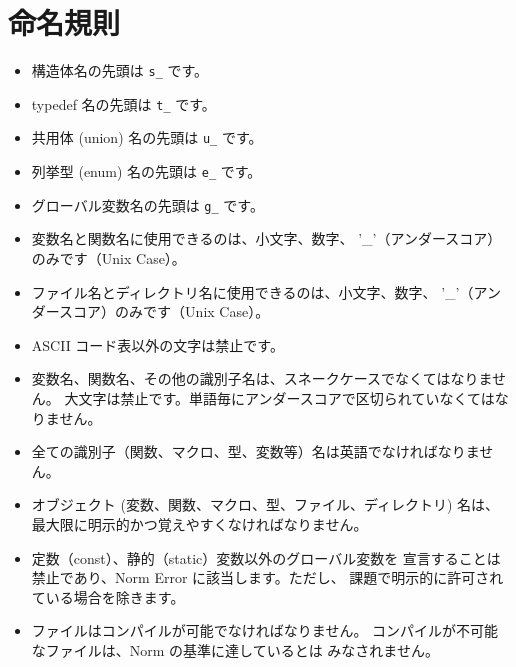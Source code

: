 \documentclass{42-ja}
\begin{document}
    \section{命名規則}

        \begin{itemize}

            \item 構造体名の先頭は
                \texttt{s\_} です。

            \item typedef 名の先頭は
                \texttt{t\_} です。

			\item 共用体 (union) 名の先頭は \texttt{u\_} です。

			\item 列挙型 (enum) 名の先頭は \texttt{e\_} です。

            \item グローバル変数名の先頭は \texttt{g\_} です。

            \item 変数名と関数名に使用できるのは、小文字、数字、
				'\_'（アンダースコア）のみです（Unix Case）。

            \item ファイル名とディレクトリ名に使用できるのは、小文字、数字、
				'\_'（アンダースコア）のみです（Unix Case）。

            \item ASCII コード表以外の文字は禁止です。

            \item 変数名、関数名、その他の識別子名は、スネークケースでなくてはなりません。
				大文字は禁止です。単語毎にアンダースコアで区切られていなくてはなりません。

            \item 全ての識別子（関数、マクロ、型、変数等）名は英語でなければなりません。

			\item オブジェクト (変数、関数、マクロ、型、ファイル、ディレクトリ)
				名は、最大限に明示的かつ覚えやすくなければなりません。

            \item 定数（const）、静的（static）変数以外のグローバル変数を
				宣言することは禁止であり、Norm Error に該当します。ただし、
				課題で明示的に許可されている場合を除きます。

            \item ファイルはコンパイルが可能でなければなりません。
				コンパイルが不可能なファイルは、Norm の基準に達しているとは
				みなされません。
        \end{itemize}
\newpage
\end{document}
